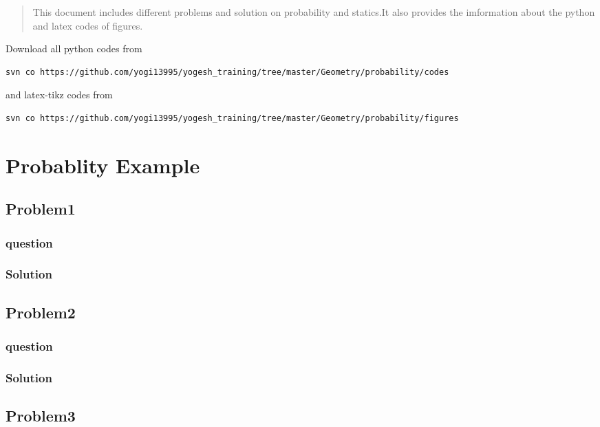 \documentclass[journal,12pt,twocolumn]{IEEEtran}
\begin{document}
%
\begin{abstract}
	This document includes different problems and solution on probability and statics.It also provides the imformation about the python and latex codes of figures.
\end{abstract}
Download all python codes from 
%
\begin{lstlisting}
svn co https://github.com/yogi13995/yogesh_training/tree/master/Geometry/probability/codes
\end{lstlisting}
%
and latex-tikz codes from 
%
\begin{lstlisting}
svn co https://github.com/yogi13995/yogesh_training/tree/master/Geometry/probability/figures
\end{lstlisting}
\section{Probablity Example}
\subsection{Problem1}
\subsubsection{question}

\subsubsection{Solution}


\subsection{Problem2}
\subsubsection{question}

\subsubsection{Solution}


\subsection{Problem3}
\end{document}
